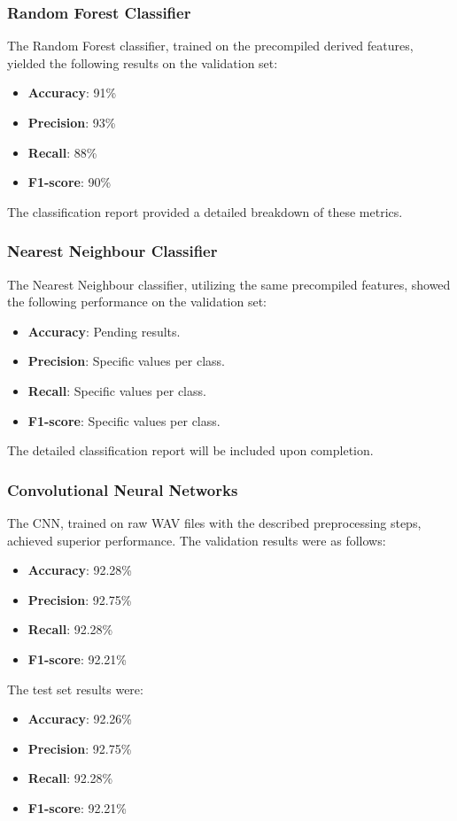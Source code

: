 \subsubsection{Random Forest Classifier}
The Random Forest classifier, trained on the precompiled derived features, yielded the following results on the validation set:
\begin{itemize}
    \item \textbf{Accuracy}: 91\%
    \item \textbf{Precision}: 93\%
    \item \textbf{Recall}: 88\%
    \item \textbf{F1-score}: 90\%
\end{itemize}
The classification report provided a detailed breakdown of these metrics.

\subsubsection{Nearest Neighbour Classifier}
The Nearest Neighbour classifier, utilizing the same precompiled features, showed the following performance on the validation set:
\begin{itemize}
    \item \textbf{Accuracy}: Pending results.
    \item \textbf{Precision}: Specific values per class.
    \item \textbf{Recall}: Specific values per class.
    \item \textbf{F1-score}: Specific values per class.
\end{itemize}
The detailed classification report will be included upon completion.

\subsubsection{Convolutional Neural Networks}
The CNN, trained on raw WAV files with the described preprocessing steps, achieved superior performance. The validation results were as follows:
\begin{itemize}
    \item \textbf{Accuracy}: 92.28\%
    \item \textbf{Precision}: 92.75\%
    \item \textbf{Recall}: 92.28\%
    \item \textbf{F1-score}: 92.21\%
\end{itemize}

The test set results were:
\begin{itemize}
    \item \textbf{Accuracy}: 92.26\%
    \item \textbf{Precision}: 92.75\%
    \item \textbf{Recall}: 92.28\%
    \item \textbf{F1-score}: 92.21\%
\end{itemize}

